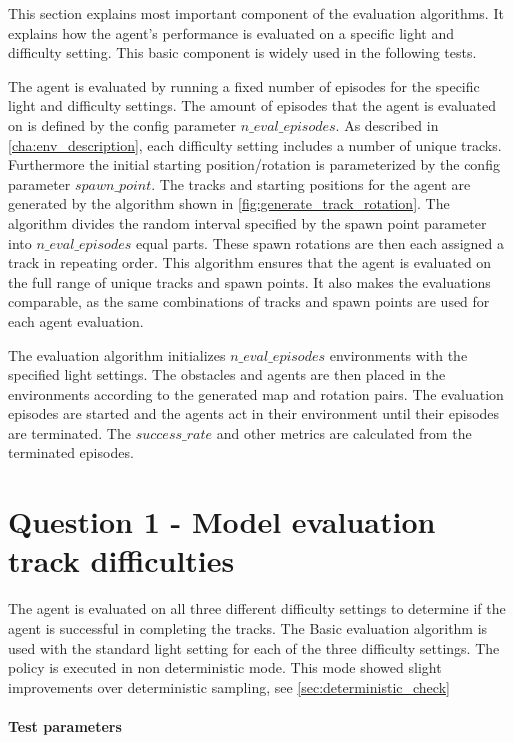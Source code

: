 This section explains most important component of the evaluation algorithms. It explains how the agent's performance is evaluated on a specific light and difficulty setting. This basic component is widely used in the following tests.

The agent is evaluated by running a fixed number of episodes for the specific light and difficulty settings. The amount of episodes that the agent is evaluated on is defined by the config parameter $n\_eval\_episodes$. As described in \ref{cha:env_description}, each difficulty setting includes a number of unique tracks. Furthermore the initial starting position/rotation is parameterized by the config parameter $spawn\_point$.
The tracks and starting positions for the agent are generated by the algorithm shown in \ref{fig:generate_track_rotation}. The algorithm divides the random interval specified by the spawn point parameter into $n\_eval\_episodes$ equal parts. These spawn rotations are then each assigned a track in repeating order.
This algorithm ensures that the agent is evaluated on the full range of unique tracks and spawn points.
It also makes the evaluations comparable, as the same combinations of tracks and spawn points are used for each agent evaluation.

The evaluation algorithm initializes $n\_eval\_episodes$ environments with the specified light settings. The obstacles and agents are then placed in the environments according to the generated map and rotation pairs. The evaluation episodes are started and the agents act in their environment until their episodes are terminated. The $success\_rate$ and other metrics are calculated from the terminated episodes.


\section{Question 1 - Model evaluation track difficulties}

The agent is evaluated on all three different difficulty settings to determine if the agent is successful in completing the tracks.
The Basic evaluation algorithm is used with the standard light setting for each of the three difficulty settings.
The policy is executed in non deterministic mode. This mode showed slight improvements over deterministic sampling, see \ref{sec:deterministic_check}



\paragraph{Test parameters}

